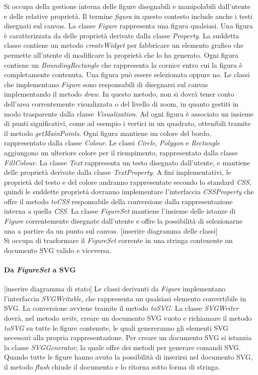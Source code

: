 Si occupa della gestione interna delle figure disegnabili e manipolabili dall'utente e delle relative propriet\`a. Il termine \textit{figura} in questo contesto include anche i testi disegnati sul canvas. La classe \textit{Figure} rappresenta una figura qualsiasi. Una figura \`e caratterizzata da delle propriet\`a derivate dalla classe \textit{Property}. La suddetta classe contiene un metodo \textit{createWidget} per fabbricare un elemento grafico che permette all'utente di modificare la propriet\`a che lo ha generato. Ogni figura contiene un \textit{BoundingRectangle} che rappresenta la cornice entro cui la figura \`e completamente contenuta. Una figura pu\`o essere selezionata oppure no. Le classi che implementano \textit{Figure} sono responsabili di disegnarsi sul canvas implementando il metodo \textit{draw}. In questo metodo, non si dovr\`a tener conto dell'area correntemente visualizzata o del livello di zoom, in quanto gestiti in modo trasparente dalla classe \textit{Visualization}. Ad ogni figura \`e associato un insieme di punti significativi, come ad esempio i vertici in un quadrato, ottenibili tramite il metodo \textit{getMainPoints}. Ogni figura mantiene un colore del bordo, rappresentato dalla classe \textit{Colour}. Le classi \textit{Circle}, \textit{Polygon} e \textit{Rectangle} aggiungono un ulteriore colore per il riempimento, rappresentato dalla classe \textit{FillColour}. La classe \textit{Text} rappresenta un testo disegnato dall'utente, e mantiene delle propriet\`a derivate dalla classe \textit{TextProperty}. A fini implementativi, le propriet\`a del testo e del colore andranno rappresentate secondo lo standard \textit{CSS}, quindi le suddette propriet\`a dovranno implementare l'interfaccia \textit{CSSProperty} che offre il metodo \textit{toCSS} responsabile della conversione dalla rappresentazione interna a quella \textit{CSS}. La classe \textit{FigureSet} mantiene l'insieme delle istanze di \textit{Figure} correntemente disegnate dall'utente e offre la possibilit\`a di selezionarne una a partire da un punto sul canvas.
[inserire diagramma delle classi] \\
Si occupa di trasformare il \textit{FigureSet} corrente in una stringa 
contenente un documento SVG valido e viceversa. 
\paragraph{Da \textit{FigureSet} a SVG}
[inserire diagramma di stato]
Le classi derivanti da \textit{Figure} implementano l'interfaccia \textit{SVGWritable}, che rappresenta un qualsiasi elemento convertibile in SVG. La conversione avviene tramite il metodo \textit{toSVG}. La classe \textit{SVGWriter} dovr\`a, nel metodo \textit{write}, creare un documento SVG vuoto e richiamare il metodo \textit{toSVG} su tutte le figure contenute, le quali genereranno gli elementi SVG necessari alla propria rappresentazione. Per creare un documento SVG si istanzia la classe \textit{SVGGenerator}, la quale offre dei metodi per generare comandi SVG. Quando tutte le figure hanno avuto la possibilit\`a di inserirsi nel documento SVG, il metodo \textit{flush} chiude il documento e lo ritorna sotto forma di stringa.
